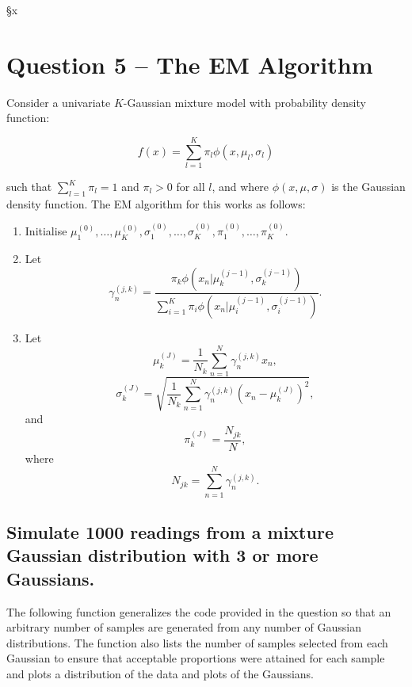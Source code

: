 §x\documentclass[]{article}
\begin{document}


\section{Question 5 – The EM Algorithm }

Consider a univariate $K$-Gaussian mixture model with probability density function:

$$
f(x) = \sum_{l=1}^{K} \pi_l \phi(x, \mu_l, \sigma_l)
$$

\noindent such that $\sum_{l=1}^{K} \pi_l = 1$ and $\pi_l > 0$ for all $l$, and where $\phi(x, \mu, \sigma)$ is the Gaussian density function. The EM algorithm for this works as follows:

\begin{enumerate}
	\item Initialise $\mu_1^{(0)}, \dots, \mu_K^{(0)}, \sigma_1^{(0)}, \dots, \sigma_K^{(0)}, \pi_1^{(0)}, \dots, \pi_K^{(0)}$.
	
	\item Let 
	$$
	\gamma_n^{(j,k)} = \frac{\pi_k \phi(x_n | \mu_k^{(j-1)}, \sigma_k^{(j-1)})}{\sum_{i=1}^{K} \pi_i \phi(x_n | \mu_i^{(j-1)}, \sigma_i^{(j-1)})}.
	$$
	
	\item Let
	$$
	\mu_k^{(J)} = \frac{1}{N_k} \sum_{n=1}^{N} \gamma_n^{(j,k)} x_n, 
	$$
	$$
	\sigma_k^{(J)} = \sqrt{\frac{1}{N_k} \sum_{n=1}^{N} \gamma_n^{(j,k)} (x_n - \mu_k^{(J)})^2},
	$$
	and 
	$$
	\pi_k^{(J)} = \frac{N_{jk}}{N},
	$$
	where
	$$
	N_{jk} = \sum_{n=1}^{N} \gamma_n^{(j,k)}.
	$$
\end{enumerate}



\subsection{Simulate 1000 readings from a mixture Gaussian distribution with 3 or more Gaussians.}

The following function generalizes the code provided in the question so that an arbitrary number of samples are generated from any number of Gaussian distributions. The function also lists the number of samples selected from each Gaussian to ensure that acceptable proportions were attained for each sample and plots a distribution of the data and plots of the Gaussians.
\end{document}
